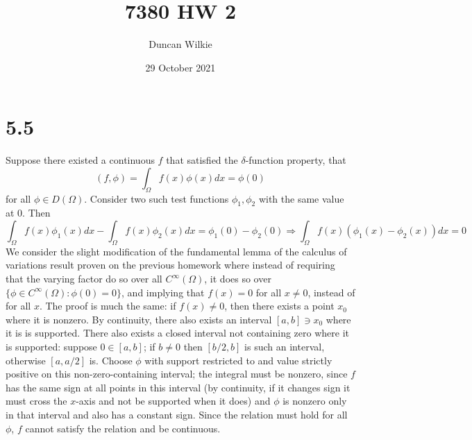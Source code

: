\message{ !name(hw2.tex)}\documentclass{article}
\title{7380 HW 2}
\author{Duncan Wilkie}
\date{29 October 2021}
\begin{document}


\maketitle

\section*{5.5}
Suppose there existed a continuous $f$ that satisfied the $\delta$-function property, that
\[(f,\phi)=\int_\Omega f(x)\phi(x)dx=\phi(0)\] for all $\phi\in D(\Omega)$. Consider two such test functions $\phi_1,\phi_2$ with the same value at 0. Then
\[\int_\Omega f(x)\phi_1(x)dx-\int_\Omega f(x)\phi_2(x)dx = \phi_1(0)-\phi_2(0)\Rightarrow \int_\Omega f(x)(\phi_1(x)-\phi_2(x))dx = 0\]
We consider the slight modification of the fundamental lemma of the calculus of variations result proven on the previous homework where instead of requiring that the varying factor do so over all $C^\infty(\Omega)$, it does so over $\{\phi\in C^\infty(\Omega): \phi(0)=0\}$, and implying that $f(x)=0$ for all $x\neq 0 $, instead of for all $x$. The proof is much the same: if $f(x)\neq 0$, then there exists a point $x_0$ where it is nonzero. By continuity, there also exists an interval $[a,b]\ni x_0 $ where it is is supported. There also exists a closed interval not containing zero where it is supported: suppose $0\in[a,b]$; if $b\neq 0$ then $[b/2, b]$ is such an interval, otherwise $[a, a/2]$ is. Choose $\phi$ with support restricted to and value strictly positive on this non-zero-containing interval; the integral must be nonzero, since $f$ has the same sign at all points in this interval (by continuity, if it changes sign it must cross the $x$-axis and not be supported when it does) and $\phi$ is nonzero only in that interval and also has a constant sign. Since the relation must hold for all $\phi$, $f$ cannot satisfy the relation and be continuous.
\end{document}
